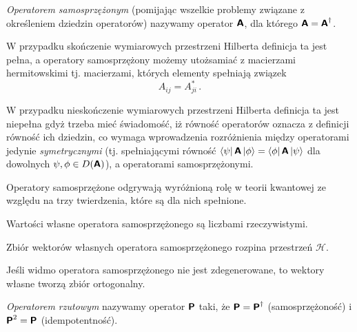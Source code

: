 \documentclass{myclass}
\begin{document}
\linesep

\begin{definition}
    \textit{Operatorem samosprzężonym} (pomijając wszelkie problemy związane z określeniem dziedzin
    operatorów) nazywamy operator \(\boldsymbol{\mathsf{A}}\), dla którego \(\boldsymbol{\mathsf{A}} = \boldsymbol{\mathsf{A}}^\dagger\).
\end{definition}

W przypadku skończenie wymiarowych przestrzeni Hilberta definicja ta jest pełna, a operatory
samosprzężony możemy utożsamiać z macierzami hermitowskimi tj. macierzami, których elementy
spełniają związek
\begin{equation*}
    A_{ij} = A_{ji}^*\,.
\end{equation*}

W przypadku nieskończenie wymiarowych przestrzeni Hilberta definicja ta jest niepełna gdyż trzeba
mieć świadomość, iż równość operatorów oznacza z definicji równość ich dziedzin, co wymaga
wprowadzenia rozróżnienia między operatorami jedynie \textit{symetrycznymi} (tj. spełniającymi
równość \(\bra{\psi}\boldsymbol{\mathsf{A}}\ket{\phi} = \bra{\phi}\boldsymbol{\mathsf{A}}\ket{\psi}\) dla dowolnych \(\psi,\phi\in
D(\boldsymbol{\mathsf{A}})\)), a operatorami samosprzężonymi.

Operatory samosprzężone odgrywają wyróżnioną rolę w teorii kwantowej ze względu na trzy twierdzenia,
które są dla nich spełnione.

\begin{theorem}
Wartości własne operatora samosprzężonego są liczbami rzeczywistymi.   
\end{theorem}

\begin{theorem}
Zbiór wektorów własnych operatora samosprzężonego rozpina przestrzeń \(\mathscr{H}\).   
\end{theorem}

\begin{theorem}
Jeśli widmo operatora samosprzężonego nie jest zdegenerowane, to wektory własne tworzą zbiór
ortogonalny.
\end{theorem}

\linesep

\begin{definition}
\textit{Operatorem rzutowym} nazywamy operator \(\boldsymbol{\mathsf{P}}\) taki, że \(\boldsymbol{\mathsf{P}} = \boldsymbol{\mathsf{P}}^\dagger\)
(samosprzężoność) i \(\boldsymbol{\mathsf{P}}^2 = \boldsymbol{\mathsf{P}}\) (idempotentność). 
\end{definition}
\end{document}
